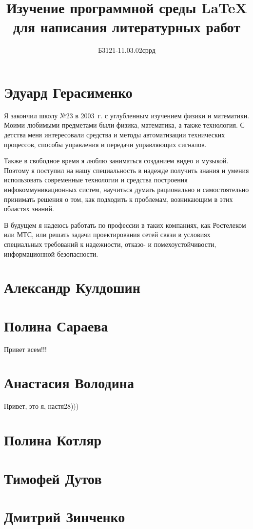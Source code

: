 \documentclass[labwork]{fefudoc}
\author{Б3121-11.03.02сррд}{Герасименко Эдуард}
\title{Изучение программной среды \LaTeX{} для написания литературных работ}
\begin{document}
\frontpage
\tableofcontents

\section{Эдуард Герасименко}
Я закончил школу №23 в 2003~г. с углубленным изучением физики и математики. Моими любимыми предметами были физика, математика, а также технология. С детства меня интересовали средства и методы автоматизации технических процессов, способы управления и передачи управляющих сигналов.

Также в свободное время я люблю заниматься созданием видео и музыкой. Поэтому я поступил на нашу специальность в надежде получить знания и умения использовать современные технологии и средства построения инфокоммуникационных систем, научиться думать рационально и самостоятельно принимать решения о том, как подходить к проблемам, возникающим в этих областях знаний.

В будущем я надеюсь работать по профессии в таких компаниях, как Ростелеком или МТС, или решать задачи проектирования сетей связи в условиях специальных требований к надежности, отказо- и помехоустойчивости, информационной безопасности.

\section{Александр Кулдошин}
\section{Полина Сараева}
Привет всем!!! 
\section{Анастасия Володина}
Привет, это я, настя28))) 
\section{Полина Котляр}
\section{Тимофей Дутов}
\section{Дмитрий Зинченко}
\end{document}
